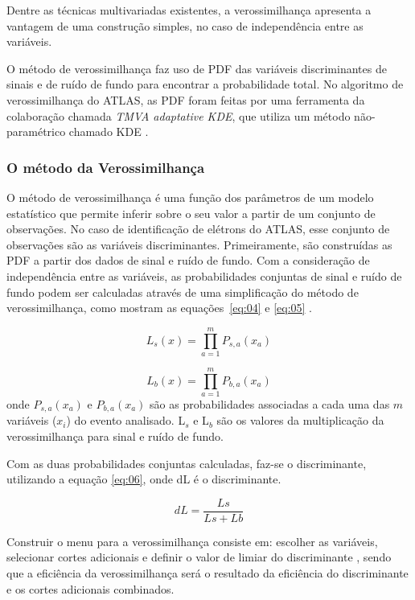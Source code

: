 Dentre as técnicas multivariadas existentes, a verossimilhança apresenta a vantagem de uma construção simples, no caso de independência entre as variáveis.

O método de verossimilhança faz uso de \ac{PDF} das variáveis discriminantes de sinais e de ruído de fundo para encontrar a probabilidade total. No algoritmo de verossimilhança do ATLAS, as PDF foram feitas por uma ferramenta da colaboração chamada \emph{\ac{TMVA} adaptative KDE}, que utiliza um método não-paramétrico chamado \ac{KDE} \cite{therhaag2012tmva}.


\subsubsection{O método da Verossimilhança}

O método de verossimilhança é uma função dos parâmetros de um modelo estatístico que permite inferir sobre o seu valor a partir de um conjunto de observações. No caso de identificação de elétrons do ATLAS, esse conjunto de observações são as variáveis discriminantes. Primeiramente, são construídas as PDF a partir dos dados de sinal e ruído de fundo. Com a consideração de independência entre as variáveis, as probabilidades conjuntas de sinal e ruído de fundo podem ser calculadas através de uma simplificação do método de verossimilhança, como mostram as equações~\ref{eq:04} e \ref{eq:05} \cite{atlas2014electron}.

\begin{equation}\label{eq:04}
    {L_s}\left( x \right) = \prod\limits_{a = 1}^m {{P_{s,a}}({x_a})}
\end{equation}

\begin{equation}\label{eq:05}
    {L_b}\left( x \right) = \prod\limits_{a = 1}^m {{P_{b,a}}({x_a})}
\end{equation}
onde ${{P_{s,a}}({x_a})}$ e ${{P_{b,a}}({x_a})}$ são as probabilidades associadas a cada uma das $m$ variáveis ($x_i$) do evento analisado. L$_{s}$ e L$_{b}$ são os valores da multiplicação da verossimilhança para sinal e ruído de fundo.

Com as duas probabilidades conjuntas calculadas, faz-se o discriminante, utilizando a equação \ref{eq:06}, onde dL é o discriminante.

\begin{equation}\label{eq:06}
    dL = \frac{{Ls}}{{Ls + Lb}}
\end{equation}

Construir o menu para a verossimilhança consiste em: escolher as variáveis, selecionar cortes adicionais e definir o valor de limiar do discriminante \cite{atlasdescription}, sendo que a eficiência da verossimilhança será o resultado da eficiência do discriminante e os cortes adicionais combinados.

